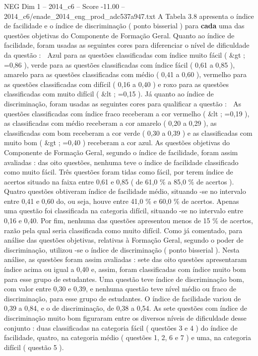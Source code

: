 \begin{textsample}{NEG Dim 1 – 2014\_c6 – Score -11.00 – 2014\_c6/enade\_2014\_eng\_prod\_adc537a947.txt}
A Tabela 3.8 apresenta o índice de facilidade e o índice de discriminação ( ponto bisserial ) para \textbf{cada} uma das questões objetivas do Componente de Formação Geral.
Quanto ao índice de facilidade, foram usadas as seguintes cores para diferenciar o nível de dificuldade da questão :  Azul para as questões classificadas com índice muito fácil ( \&gt ; =0,86 ), verde para as questões classificadas com índice fácil ( 0,61 a 0,85 ), amarelo para as questões classificadas com médio ( 0,41 a 0,60 ), vermelho para as questões classificadas com difícil ( 0,16 a 0,40 ) e roxo para as questões classificadas com muito difícil ( \&lt ; =0,15 ).
Já quanto ao índice de discriminação, foram usadas as seguintes cores para qualificar a questão :  As questões classificadas com índice fraco receberam a cor vermelho ( \&lt ; =0,19 ), as classificadas com médio receberam a cor amarelo ( 0,20 a 0,29 ), as classificadas com bom receberam a cor verde ( 0,30 a 0,39 ) e as classificadas com muito bom ( \&gt ; =0,40 ) receberam a cor azul.
As questões objetivas do Componente de Formação Geral, segundo o índice de facilidade, foram assim avaliadas : das oito questões, nenhuma teve o índice de facilidade classificado como muito fácil.
Três questões foram tidas como fácil, por terem índice de acertos situado na faixa entre 0,61 e 0,85 ( de 61,0 \% a 85,0 \% de acertos ).
Quatro questões obtiveram índice de facilidade médio, situando -se no intervalo entre 0,41 e 0,60 do, ou seja, houve entre 41,0 \% e 60,0 \% de acertos.
Apenas uma questão foi classificada na categoria difícil, situando -se no intervalo entre 0,16 e 0,40.
Por fim, nenhuma das questões apresentou menos de 15 \% de acertos, razão pela qual seria classificada como muito difícil.
Como já comentado, para análise das questões objetivas, relativas à Formação Geral, segundo o poder de discriminação, utilizou -se o índice de discriminação ( ponto bisserial ).
Nesta análise, as questões foram assim avaliadas : sete das oito questões apresentaram índice acima ou igual a 0,40 e, assim, foram classificadas com índice muito bom para esse grupo de estudantes.
Uma questão teve índice de discriminação bom, com valor entre 0,30 e 0,39, e nenhuma questão teve nível médio ou fraco de discriminação, para esse grupo de estudantes.
O índice de facilidade variou de 0,39 a 0,84, e o de discriminação, de 0,38 a 0,54.
As sete questões com índice de discriminação muito bom figuraram entre os diversos níveis de dificuldade desse conjunto : duas classificadas na categoria fácil ( questões 3 e 4 ) do índice de facilidade, quatro, na categoria médio ( questões 1, 2, 6 e 7 ) e uma, na categoria difícil ( questão 5 ).

\end{textsample}
